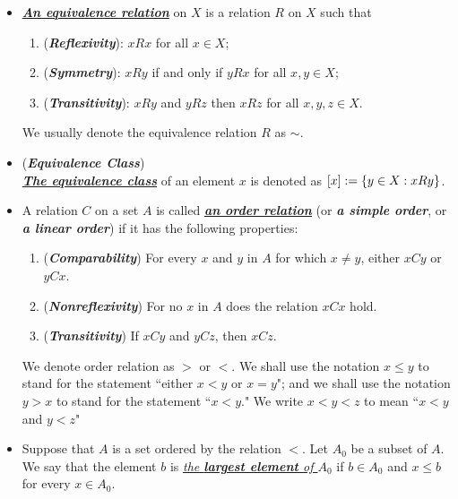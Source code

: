 \documentclass[11pt]{article}
\begin{document}
\begin{itemize}
\item \begin{definition}
\underline{\emph{\textbf{An equivalence relation}}} on $X$ is a relation $R$ on $X$ such that 
\begin{enumerate}
\item (\emph{\textbf{Reflexivity}}): $xRx$ for all $x \in X$;
\item (\emph{\textbf{Symmetry}}): $xRy$ if and only if $yRx$ for all $x,y \in X$;
\item (\emph{\textbf{Transitivity}}): $xRy$ and $yRz$ then $xRz$ for all $x,y,z \in X$. 
\end{enumerate}
We usually denote the equivalence relation $R$ as $\sim$. 
\end{definition}

\item \begin{definition} (\emph{\textbf{Equivalence Class}})\\
\underline{\emph{\textbf{The equivalence class}}} of an element $x$ is denoted as $[x] := \left\{y \in X:  xRy\right\}$. 
\end{definition}

\item  \begin{definition}
A relation $C$ on a set $A$ is called \underline{\emph{\textbf{an order relation}}} (or \emph{\textbf{a simple order}}, or \emph{\textbf{a linear order}})
if it has the following properties:
\begin{enumerate}
\item (\emph{\textbf{Comparability}}) For every $x$ and $y$ in $A$ for which $x \neq y$, either $xCy$ or $yCx$.
\item (\emph{\textbf{Nonreflexivity}}) For no $x$ in $A$ does the relation $xCx$ hold.
\item (\emph{\textbf{Transitivity}}) If $xCy$ and $yCz$, then $xCz$.
\end{enumerate}
We denote order relation as $>$ or $<$. We shall use the notation $x \le y$ to stand for the statement ``either $x < y$ or $x = y$";
and we shall use the notation $y > x$ to stand for the statement ``$x < y$." We write $x < y < z$ to mean ``$x < y$ and $y < z$"
\end{definition}



\item \begin{definition}
Suppose that $A$ is a set ordered by the relation $<$.  Let $A_0$ be a subset of $A$. We say that the element $b$ is \underline{\emph{the \textbf{largest element} of $A_0$}} if $b \in A_0$ and $x \le b$ for every $x \in A_0$. 


\end{definition}
\end{itemize}
\end{document}
